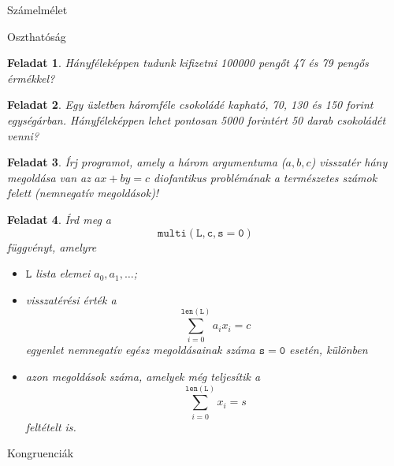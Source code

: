 \documentclass{amsbook}
\theoremstyle{mystyle}
\newtheorem{exercise}{Feladat}[part]
\newtheorem{definition}{Definíció}[section]
\begin{document}
\begin{part}{Számelmélet}
\begin{section}{Oszthatóság}
  \begin{exercise}
    Hányféleképpen tudunk kifizetni 100000 peng\H ot 47 és 79 peng\H os
    érmékkel?
  \end{exercise}


  \begin{exercise}
    Egy üzletben háromféle csokoládé kapható, 70, 130 és 150 forint
    egységárban. Hányféleképpen lehet pontosan 5000 forintért 50 
    darab csokoládét venni?
  \end{exercise}
    
  \begin{exercise}
    Írj programot, amely a három argumentuma ($a,b,c$) visszatér hány
    megoldása van az $ax+by=c$ diofantikus problémának a természetes 
    számok felett (nemnegatív megoldások)!
  \end{exercise}

  \begin{exercise}
    Írd meg a \[ \mathtt{multi(L, c, s=0)} \]
    függvényt, amelyre
    \begin{itemize}
      \item $\mathtt{L}$ lista elemei $a_0,a_1,\dots$;
      \item visszatérési érték a \[ \sum_{i=0}^{\mathtt{len(L)}} a_ix_i = c \]
        egyenlet nemnegatív egész megoldásainak száma $\mathtt{s=0}$ esetén,
        különben
      \item azon megoldások száma, amelyek még teljesítik a 
        \[ \sum_{i=0}^{\mathtt{len(L)}} x_i = s \]
        feltételt is.
    \end{itemize}
  \end{exercise}
\end{section}

\begin{section}{Kongruenciák}
\end{section}

\end{part}
\end{document}

